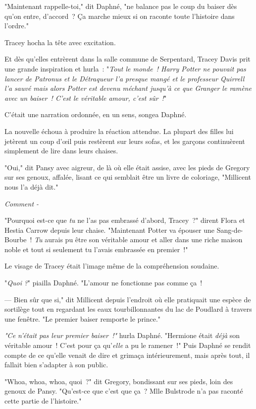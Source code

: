 "Maintenant rappelle-toi," dit Daphné, "ne balance pas le coup du baiser dès qu'on entre, d'accord~? Ça marche mieux si on raconte toute l'histoire dans l'ordre."

Tracey hocha la tête avec excitation.

Et dès qu'elles entrèrent dans la salle commune de Serpentard, Tracey Davis prit une grande inspiration et hurla~: "\emph{Tout le monde~! Harry Potter ne pouvait pas lancer de Patronus et le Détraqueur l'a presque mangé et le professeur Quirrell l'a sauvé mais alors Potter est devenu méchant jusqu'à ce que Granger le ramène avec un baiser~! C'est le véritable amour, c'est sûr~!}"

C'était une narration ordonnée, en un sens, songea Daphné.

La nouvelle échoua à produire la réaction attendue. La plupart des filles lui jetèrent un coup d'œil puis restèrent sur leurs sofas, et les garçons continuèrent simplement de lire dans leurs chaises.

"Oui," dit Pansy avec aigreur, de là où elle était assise, avec les pieds de Gregory sur ses genoux, affalée, lisant ce qui semblait être un livre de coloriage, "Millicent nous l'a déjà dit."

\emph{Comment -}

"Pourquoi est-ce que \emph{tu} ne l'as pas embrassé d'abord, Tracey~?" dirent Flora et Hestia Carrow depuis leur chaise. "Maintenant Potter va épouser une Sang-de-Bourbe~! \emph{Tu} aurais pu être son véritable amour et aller dans une riche maison noble et tout si seulement tu l'avais embrassée en premier~!"

Le visage de Tracey était l'image même de la compréhension soudaine.

"\emph{Quoi} \emph{?}" piailla Daphné. "L'amour ne fonctionne pas comme ça~!

--- Bien sûr que si," dit Millicent depuis l'endroit où elle pratiquait une espèce de sortilège tout en regardant les eaux tourbillonnantes du lac de Poudlard à travers une fenêtre. "Le premier baiser remporte le prince."

\emph{"Ce n'était pas leur premier baiser~!"} hurla Daphné. "Hermione était \emph{déjà} son véritable amour~! C'est pour ça qu'\emph{elle} a pu le ramener~!" Puis Daphné se rendit compte de ce qu'elle venait de dire et grimaça intérieurement, mais après tout, il fallait bien s'adapter à son public.

"Whoa, whoa, whoa, quoi~?" dit Gregory, bondissant sur ses pieds, loin des genoux de Pansy. "Qu'est-ce que c'est que ça~? Mlle Bulstrode n'a pas raconté cette partie de l'histoire."

